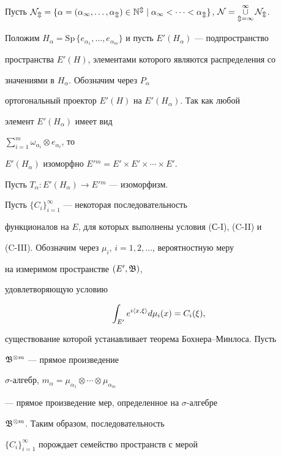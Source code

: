 Пусть $\cal{N}_m=\{\alpha=(\alpha_1,\dotsc,


\alpha_m)\in \Bbb{N}^m\mid \alpha_1 < \dotsb <


\alpha_m\}$, $\cal{N}=\mathop{\cup}\limits_{m=1}^{\infty}\cal{N}_m$.


Положим $H_{\alpha}=\mathrm{Sp}\,\{e_{\alpha_1},


\dotsc,e_{\alpha_m}\}$ и пусть $E'(H_{\alpha})$ --- подпространство


пространства $E'(H)$, элементами которого являются распределения со


значениями в $H_{\alpha}$. Обозначим через $P_{\alpha}$


ортогональный проектор $E'(H)$ на $E'(H_{\alpha})$. Так как любой


элемент $E'(H_{\alpha})$ имеет вид


$\sum\limits_{i=1}^m\omega_{\alpha_i}\otimes e_{\alpha_i}$, то


$E'(H_{\alpha})$ изоморфно $E'{}^m=E'\times E'\times\dotsb\times E'$.


Пусть $T_{\alpha}:E'(H_{\alpha})\to E'{}^m$ --- изоморфизм.





Пусть $\{C_i\}_{i=1}^{\infty}$ --- некоторая последовательность


функционалов на $E$, для которых выполнены условия (С-I), (C-II) и


(C-III). Обозначим через $\mu_i$, $i=1,2,\dotsc$, вероятностную меру


на измеримом пространстве $(E',\frak{B})$,


удовлетворяющую условию


$$


\int_{E'}e^{i\la x,\xi\ra }d\mu_i(x)=C_i(\xi),


$$


существование которой устанавливает теорема Бохнера--Минлоса. Пусть


$\frak{B}^{\otimes m}$ --- прямое произведение


$\sigma$-алгебр, $m_{\alpha}=


\mu_{\alpha_1}\otimes\dotsb\otimes\mu_{\alpha_m}$


--- прямое произведение мер, определенное на $\sigma$-алгебре


$\frak{B}^{\otimes m}$. Таким образом, последовательность


$\{C_i\}_{i=1}^{\infty}$ порождает семейство пространств с мерой


